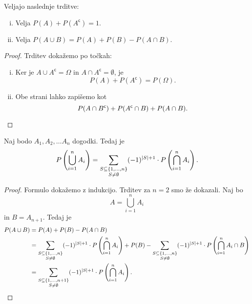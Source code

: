 \begin{trditev}
Veljajo naslednje trditve:

\begin{enumerate}[i)]
\item Velja $P(A) + P(A^\mathsf{c}) = 1$.
\item Velja $P(A \cup B) = P(A) + P(B) - P(A \cap B)$.
\end{enumerate}
\end{trditev}

\begin{proof}
Trditev dokažemo po točkah:

\begin{enumerate}[i)]
\item Ker je $A \cup A^\mathsf{c} = \Omega$ in
$A \cap A^\mathsf{c} = \emptyset$, je
\[
P(A) + P(A^\mathsf{c}) = P(\Omega).
\]
\item Obe strani lahko zapišemo kot
\[
P(A \cap B^\mathsf{c}) + P(A^\mathsf{c} \cap B) + P(A \cap B).
\qedhere
\]
\end{enumerate}
\end{proof}


\begin{izrek}
Naj bodo $A_1, A_2, \dots A_n$ dogodki. Tedaj je
\[
P\left(\bigcup_{i=1}^n A_i\right) =
\sum_{\substack{S \subseteq \left\{1, \dots, n\right\} \\ S \ne \emptyset}}
(-1)^{\left\lvert S\right\rvert+1} \cdot P\left(\bigcap_{i=1}^n A_i\right).
\]
\end{izrek}

\begin{proof}
Formulo dokažemo z indukcijo. Trditev za $n=2$ smo že dokazali.
Naj bo
\[
A = \bigcup_{i=1}^n A_i
\]
in $B = A_{n+1}$.
Tedaj je
\begin{align*}
P(A \cup B) &= P(A) + P(B) - P(A \cap B)
\\
&=
\sum_{\substack{S \subseteq \left\{1, \dots, n\right\} \\ S \ne \emptyset}}
(-1)^{\left\lvert S\right\rvert+1} \cdot P\left(\bigcap_{i=1}^n A_i\right) + P(B) -
\sum_{\substack{S \subseteq \left\{1, \dots, n\right\} \\ S \ne \emptyset}}
(-1)^{\left\lvert S\right\rvert+1} \cdot P\left(\bigcap_{i=1}^n A_i \cap B\right)
\\
&=
\sum_{\substack{S \subseteq \left\{1,\dots, n+1\right\} \\ S \ne \emptyset}}
(-1)^{\left\lvert S\right\rvert+1} \cdot P\left(\bigcap_{i=1}^n A_i\right). \qedhere
\end{align*}
\end{proof}


